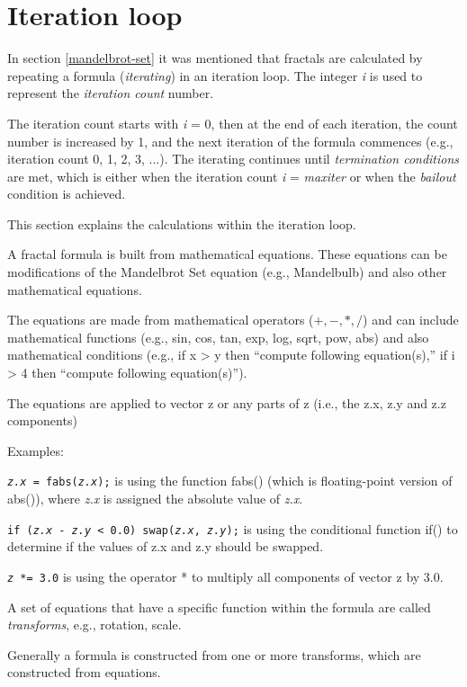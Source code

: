 \section{Iteration loop}\label{iteration-loop}

In section \ref{mandelbrot-set} it was mentioned that fractals are calculated
by repeating a formula (\emph{iterating}) in an iteration loop. 
The integer \emph{i} is used to represent the \emph{iteration count} number.

The iteration count starts with \emph{i} = 0, then at the end of each iteration, the
count number is increased by 1, and the next iteration of the formula commences 
(e.g., iteration count  0, 1, 2, 3, ...). The iterating continues until \emph{termination conditions} are met, 
which is either when the iteration count \emph{i} =  \emph{maxiter} or when the \emph{bailout} condition is achieved. 

This section explains the calculations within the iteration loop.

A fractal formula is built from mathematical equations. 
These equations can be modifications of the Mandelbrot Set equation (e.g., Mandelbulb) and also other mathematical equations.

The equations are made from mathematical operators ($+, -, *, /$) 
and can include mathematical functions (e.g., sin, cos, tan, exp, log, sqrt, pow, abs) 
and also mathematical conditions (e.g., if x > y then ``compute following equation(s),'' if i > 4 then ``compute following equation(s)'').

The equations are applied to vector z or any parts of z (i.e., the z.x, z.y and z.z components)

Examples:

{\tt\emph{z.x} = fabs(\emph{z.x});} is using the function fabs() (which is floating-point version of abs()), where \emph{z.x} is assigned the absolute value of \emph{z.x}.

{\tt if (\emph{z.x} - \emph{z.y} < 0.0) swap(\emph{z.x}, \emph{z.y});} is using the conditional function if() to determine if the values of z.x and z.y should be swapped.

{\tt \emph{z} *= 3.0} is using the operator * to multiply all components of vector z by 3.0.

A set of equations that have a specific function within the formula are called \emph{transforms}, e.g., rotation, scale.

Generally a formula is constructed from one or more transforms, which are constructed from equations.

